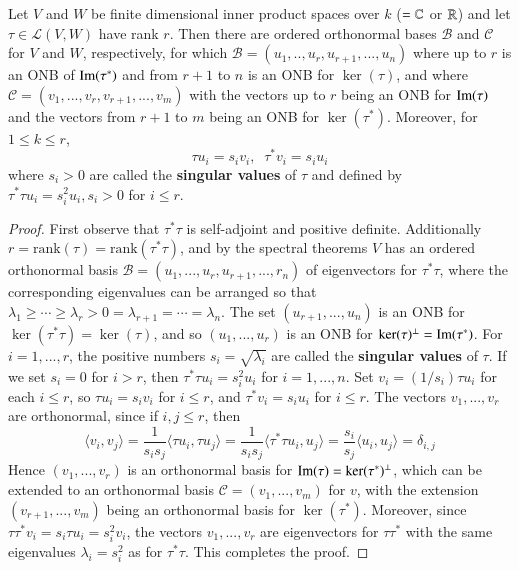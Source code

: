 \begin{theorem}
    Let $V$ and $W$ be finite dimensional inner product spaces over $k$ ($= \mathbb C$ or $\mathbb R$) and let $\tau \in \mathcal{L}(V,W)$ have rank $r$. Then there are ordered orthonormal bases $\mathcal{B}$ and $\mathcal{C}$ for $V$ and $W$, respectively, for which $\mathcal{B} = (u_1,..,u_r,u_{r+1},...,u_n)$ where up to $r$ is an ONB of $\operatorname{Im}(\tau^*)$ and from $r+1$ to $n$ is an ONB for $\ker(\tau)$, and where $\mathcal{C} = (v_1,...,v_r,v_{r+1},...,v_m)$ with the vectors up to $r$ being an ONB for $\operatorname{Im}(\tau)$ and the vectors from $r+1$ to $m$ being an ONB for $\ker(\tau^*)$. Moreover, for $1 \leq k \leq r$, \begin{equation*}
        \tau u_i = s_iv_i,\;\;\tau^*v_i = s_iu_i
    \end{equation*}
    where $s_i > 0$ are called the \textbf{singular values} of $\tau$ and defined by $\tau^*\tau u_i = s_i^2u_i,s_i > 0$ for $i \leq r$.
\end{theorem}
\begin{proof}
    First observe that $\tau^*\tau$ is self-adjoint and positive definite. Additionally $r = \text{rank}(\tau) = \text{rank}(\tau^*\tau)$, and by the spectral theorems $V$ has an ordered orthonormal basis $\mathcal{B} = (u_1,...,u_r,u_{r+1},...,r_n)$ of eigenvectors for $\tau^*\tau$, where the corresponding eigenvalues can be arranged so that $\lambda_1\geq \cdots \geq \lambda_r > 0 = \lambda_{r+1}=\cdots = \lambda_n$. The set $(u_{r+1},...,u_n)$ is an ONB for $\ker(\tau^*\tau) = \ker(\tau)$, and so $(u_1,...,u_r)$ is an ONB for $\ker(\tau)^{\perp} = \operatorname{Im}(\tau^*)$. For $i = 1,...,r$, the positive numbers $s_i = \sqrt{\lambda_i}$ are called the \textbf{singular values} of $\tau$. If we set $s_i = 0$ for $i > r$, then $\tau^*\tau u_i = s_i^2u_i$ for $i = 1,...,n$. Set $v_i = (1/s_i)\tau u_i$ for each $i \leq r$, so $\tau u_i = s_iv_i$ for $i \leq r$, and $\tau^*v_i = s_iu_i$ for $i \leq r$. The vectors $v_1,...,v_r$ are orthonormal, since if $i,j \leq r$, then \begin{equation*}
        \langle v_i,v_j\rangle = \frac{1}{s_is_j}\langle \tau u_i,\tau u_j\rangle = \frac{1}{s_is_j}\langle \tau^*\tau u_i,u_j\rangle = \frac{s_i}{s_j}\langle u_i,u_j\rangle = \delta_{i,j}
    \end{equation*}
    Hence $(v_1,...,v_r)$ is an orthonormal basis for $\operatorname{Im}(\tau) = \ker(\tau^*)^{\perp}$, which can be extended to an orthonormal basis $\mathcal{C} = (v_1,...,v_m)$ for $v$, with the extension $(v_{r+1},...,v_m)$ being an orthonormal basis for $\ker(\tau^*)$. Moreover, since $\tau\tau^*v_i = s_i\tau u_i = s_i^2v_i$, the vectors $v_1,...,v_r$ are eigenvectors for $\tau\tau^*$ with the same eigenvalues $\lambda_i = s_i^2$ as for $\tau^*\tau$. This completes the proof.
\end{proof}

